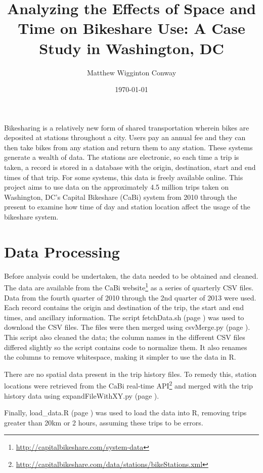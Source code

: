 \documentclass[letterpaper,11pt]{article}
\title{Analyzing the Effects of Space and Time on Bikeshare Use: A Case Study in Washington, DC}
\author{Matthew Wigginton Conway}
\date{\today}
\newcommand{\reflst}[1]{#1 (page \pageref{#1})}
\begin{document}
\fancyhfoffset[E,O]{0pt}
\maketitle

Bikesharing is a relatively new form of shared transportation wherein
bikes are deposited at stations throughout a city. Users pay an annual
fee and they can then take bikes from any station and return them to
any station. These systems generate a wealth of data. The stations are
electronic, so each time a trip is taken, a record is stored in a
database with the origin, destination, start and end times of that
trip. For some systems, this data is freely available online. This
project aims to use data on the approximately 4.5 million trips taken
on Washington, DC's Capital Bikeshare (CaBi) system from 2010 through the
present to examine how time of day and station location affect the
usage of the bikeshare system.

\section{Data Processing}

Before analysis could be undertaken, the data needed to be obtained
and cleaned.  The data are available from the CaBi
website\footnote{\url{http://capitalbikeshare.com/system-data}} as a
series of quarterly CSV files. Data from the fourth quarter of 2010
through the 2nd quarter of 2013 were used. Each record contains the
origin and destination of the trip, the start and end times, and
ancillary information.  The script \reflst{fetchData.sh} was used to
download the CSV files. The files were then merged using
\reflst{csvMerge.py}. This script also cleaned the data; the column
names in the different CSV files differed slightly so the script
contains code to normalize them.  It also renames the columns to
remove whitespace, making it simpler to use the data in R.

There are no spatial data present in the trip history files. To remedy
this, station locations were retrieved from the CaBi real-time
API\footnote{\url{http://capitalbikeshare.com/data/stations/bikeStations.xml}}
and merged with the trip history data using
\reflst{expandFileWithXY.py}.

Finally, \reflst{load\string_data.R} was used to load the data into R,
removing trips greater than 20km or 2 hours, assuming these trips to
be errors.
\end{document}
